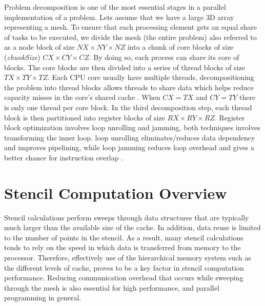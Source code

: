 Problem decomposition is one of the most essential stages in a parallel implementation of a problem. Lets assume that we have a large 3D array representing a mesh. To ensure that each processing element gets an equal share of tasks to be executed, we divide the mesh (the entire problem) also referred to as a node block of size \(NX \times NY \times NZ\) into a chunk of core blocks of size (\textit{chunkSize}) \(CX \times CY \times CZ\). By doing so, each process can share its core of blocks. The core blocks are then divided into a series of thread blocks of size \(TX \times TY \times TZ\). Each CPU core usually have multiple threads, decompositioning the problem into thread blocks allows threads to share data which helps reduce capacity misses in the core’s shared cache \cite{article9}. When \( CX = TX\) and \( CY = TY\) there is only one thread per core block. In the third decomposition step, each thread block is then partitioned into register blocks of size \(RX \times RY \times RZ\). Register block optimization involves loop unrolling and jamming, both techniques involves transforming the inner loop. loop unrolling eliminates/reduces data dependency and improves pipelining, while loop jamming reduces loop overhead and gives a better chance for instruction overlap \cite{article10}.


\section{Stencil Computation Overview}
Stencil calculations perform sweeps through data structures that are typically much larger than the available size of the cache. In addition, data reuse is limited to the number of points in the stencil. As a result, many stencil calculations tends to rely on the speed in which data is transferred from memory to the processor. Therefore, effectively use of the hierarchical memory system such as the different levels of cache, proves to be a key factor in stencil computation performance. Reducing communication overhead that occurs while sweeping through the mesh is also essential for high performance, and parallel programming in general.

